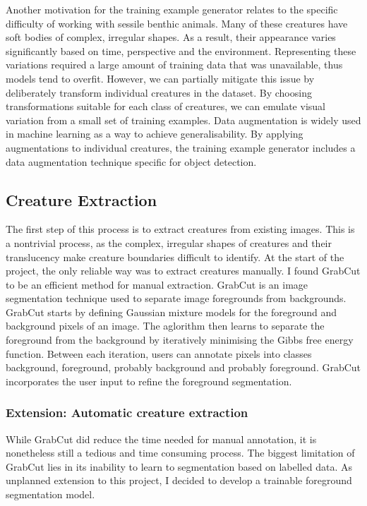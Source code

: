\documentclass[12pt,a4paper,twoside,openany]{report}
\begin{document}
Another motivation for the training example generator relates to the specific difficulty of working with sessile benthic animals. Many of these creatures have soft bodies of complex, irregular shapes. As a result, their appearance varies significantly based on time, perspective and the environment. Representing these variations required a large amount of training data that was unavailable, thus models tend to overfit. However, we can partially mitigate this issue by deliberately transform individual creatures in the dataset. By choosing transformations suitable for each class of creatures, we can emulate visual variation from a small set of training examples. Data augmentation is widely used in machine learning as a way to achieve generalisability. By applying augmentations to individual creatures, the training example generator includes a data augmentation technique specific for object detection. 


\subsection{Creature Extraction}
The first step of this process is to extract creatures from existing images.
This is a nontrivial process, as the complex, irregular shapes of creatures and their translucency make creature boundaries difficult to identify.
At the start of the project, the only reliable way was to extract creatures manually. 
I found GrabCut \cite{rother_grabcut_nodate} to be an efficient method for manual extraction. GrabCut is an image segmentation technique used to separate image foregrounds from backgrounds. GrabCut starts by defining Gaussian mixture models for the foreground and background pixels of an image. The aglorithm then learns to separate the foreground from the background by iteratively minimising the Gibbs free energy function. Between each iteration, users can annotate pixels into classes background, foreground, probably background and probably foreground. GrabCut incorporates the user input to refine the foreground segmentation. 

\subsubsection{Extension: Automatic creature extraction} \label{section:yolite_before}
While GrabCut did reduce the time needed for manual annotation, it is nonetheless still a tedious and time consuming process. The biggest limitation of GrabCut lies in its inability to learn to segmentation based on labelled data. As unplanned extension to this project, I decided to develop a trainable foreground segmentation model. 
\end{document}
